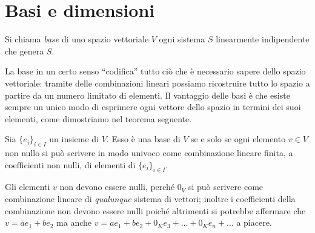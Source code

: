 \section{Basi e dimensioni} \label{sec:basi-dimensioni}
\begin{definizione} \label{d:base}
	Si chiama \emph{base} di uno spazio vettoriale $V$ ogni sistema $S$ linearmente indipendente che genera $S$.
\end{definizione}
La base in un certo senso ``codifica'' tutto ciò che è necessario sapere dello spazio vettoriale: tramite delle combinazioni lineari possiamo ricostruire tutto lo spazio a partire da un numero limitato di elementi.
Il vantaggio delle basi è che esiste sempre un unico modo di esprimere ogni vettore dello spazio in termini dei suoi elementi, come dimostriamo nel teorema seguente.
\begin{teorema}
	Sia $\{e_i\}_{i\in I}$ un insieme di $V$.
	Esso è una base di $V$ se e solo se ogni elemento $v\in V$ non nullo si può scrivere in modo univoco come combinazione lineare finita, a coefficienti non nulli, di elementi di $\{e_i\}_{i\in I}$.
\end{teorema}
Gli elementi $v$ non devono essere nulli, perché $0_V$ si può scrivere come combinazione lineare di \emph{qualunque} sistema di vettori; inoltre i coefficienti della combinazione non devono essere nulli poich\'e altrimenti si potrebbe affermare che $v=ae_1+be_2$ ma anche $v=ae_1+be_2+0_Ke_3+\dots+0_Ke_n+\dots$ a piacere.
